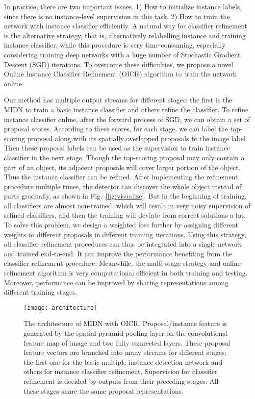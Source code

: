 \documentclass[10pt,twocolumn,letterpaper]{article}
\begin{document}
In practice, there are two important issues.
1) How to initialize instance labels, since there is no instance-level supervision in this task.
2) How to train the network with instance classifier efficiently.
A natural way for classifier refinement is the alternative strategy, that is, alternatively relabelling instance and training instance classifier, while this procedure is very time-consuming, especially considering training deep networks with a huge number of Stochastic Gradient Descent (SGD) iterations.
To overcome these difficulties, we propose a novel Online Instance Classifier Refinement (OICR) algorithm to train the network online.

Our method has multiple output streams for different stages: the first is the MIDN to train a basic instance classifier and others refine the classifier.
To refine instance classifier online, after the forward process of SGD, we can obtain a set of proposal scores.
According to these scores, for each stage, we can label the top-scoring proposal along with its spatially overlapped proposals to the image label.
Then these proposal labels can be used as the supervision to train instance classifier in the next stage.
Though the top-scoring proposal may only contain a part of an object, its adjacent proposals will cover larger portion of the object.
Thus the instance classifier can be refined.
After implementing the refinement procedure multiple times, the detector can discover the whole object instead of parts gradually, as shown in Fig.~\ref{fig:visualize}.
But in the beginning of training, all classifiers are almost non-trained, which will result in very noisy supervision of refined classifiers, and then the training will deviate from correct solutions a lot.
To solve this problem, we design a weighted loss further by assigning different weights to different proposals in different training iterations.
Using this strategy, all classifier refinement procedures can thus be integrated into a single network and trained end-to-end.
It can improve the performance benefiting from the classifier refinement procedure.
Meanwhile, the multi-stage strategy and online refinement algorithm is very computational efficient in both training and testing.
Moreover, performance can be improved by sharing representations among different training stages.


\begin{figure*}[!t]
\begin{center}
   \texttt{[image: architecture]}
\end{center}
   \caption{The architecture of MIDN with OICR.
   Proposal/instance feature is generated by the spatial pyramid pooling layer on the convolutional feature map of image and two fully connected layers.
   These proposal feature vectors are branched into many streams for different stages: the first one for the basic multiple instance detection network and others for instance classifier refinement.
   Supervision for classifier refinement is decided by outputs from their preceding stages.
   All these stages share the same proposal representations.}
\label{fig:architecture}
\end{figure*}
\end{document}

